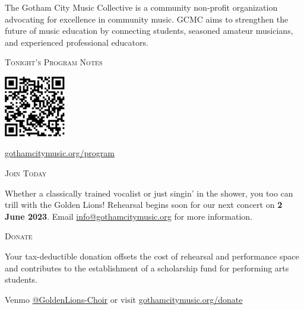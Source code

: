 \documentclass{article}[10pt]
\begin{document}
\begin{titlepage}
\begin{center}
\begin{minipage}{4in}
\begin{flushleft}
\begin{small}
The Gotham City Music Collective is a community non-profit organization advocating for excellence in community music.
GCMC aims to strengthen the future of music education by connecting students, seasoned amateur musicians, and experienced professional educators.
\end{small}
\end{flushleft}

\begin{center}
{\large{\textsc{Tonight's Program Notes}}}\
\vspace{0.1in}

    {\includegraphics[width=0.2\textwidth]{program_url.pdf}}

    \href{https://gothamcitymusic.org/program}{gothamcitymusic.org/program}
\end{center}

\begin{center}
{\large{\textsc{Join Today}}}
\vspace{-0.1in}
\begin{flushleft}
\begin{small}
Whether a classically trained vocalist or just singin' in the shower, you too can trill with the Golden Lions!
Rehearsal begins soon for our next concert on \textbf{2 June 2023}.
Email \href{info@gothamcitymusic.org}{info@gothamcitymusic.org} for more information.
\end{small}
\end{flushleft}
\end{center}

\begin{center}
{\large{\textsc{Donate}}}
\vspace{-0.1in}
\begin{flushleft}
\begin{small}
Your tax-deductible donation offsets the cost of rehearsal and performance space and contributes to the establishment of a scholarship fund for performing arts students.
\end{small}
\end{flushleft}
Venmo \href{https://account.venmo.com/u/GoldenLions-choir}{@GoldenLions-Choir} or visit \href{https://gothamcitymusic.org/donate}{gothamcitymusic.org/donate}
\end{center}


\end{minipage}
\end{center}
\end{titlepage}
\end{document}
